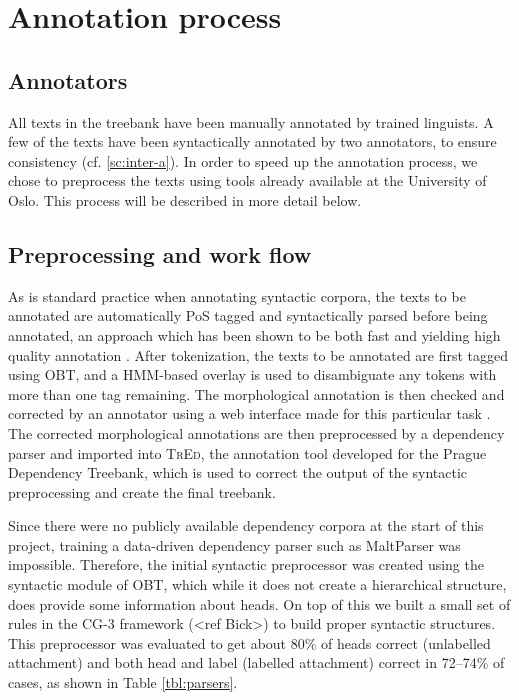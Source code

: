 \documentclass[11pt,a4paper]{article}
\let\app=\textsc
\begin{document}


\section{Annotation process}
\subsection{Annotators}
All texts in the treebank have been manually annotated by trained linguists. A few of the texts have been syntactically annotated by two annotators, to ensure consistency (cf. \ref{sc:inter-a}). In order to speed up the annotation process, we chose to preprocess the texts using tools already available at the University of Oslo. This process will be described in more detail below.

\subsection{Preprocessing and work flow}
As is standard practice when annotating syntactic corpora, the texts to be
annotated are automatically PoS tagged and syntactically parsed before being
annotated, an approach which has been shown to be both fast and yielding
high quality annotation \cite{Mar:San:Mar:93,For:Sag:10,Skjaerholt:13}.
After tokenization, the texts to be annotated are first tagged using OBT, and
a HMM-based overlay \cite{Joh:Hag:No:Lyn:2011} is used to disambiguate any
tokens with more than one tag remaining. The morphological annotation is then
checked and corrected by an annotator using a web interface made for this
particular task \cite{Lyn:13}. The corrected morphological annotations are
then preprocessed by a dependency parser and imported into \app{TrEd}, the
annotation tool developed for the Prague Dependency Treebank, which is used to
correct the output of the syntactic preprocessing and create the final
treebank.

Since there were no publicly available dependency corpora at the start of this
project, training a data-driven dependency parser such as MaltParser was
impossible. Therefore, the initial syntactic preprocessor was created using
the syntactic module of OBT, which while it does not create a hierarchical
structure, does provide some information about heads. On top of this we built
a small set of rules in the CG-3 framework (<ref Bick>) to build proper
syntactic structures. This preprocessor was evaluated to get about 80\% of
heads correct (unlabelled attachment) and both head and label (labelled
attachment) correct in 72--74\% of cases, as shown in Table \ref{tbl:parsers}.
\end{document}
